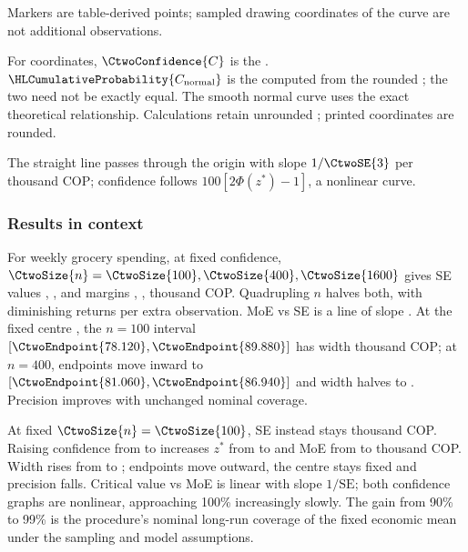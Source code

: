 \begin{landscape}
\begin{minipage}{\linewidth}
\begin{minipage}[t]{.43\linewidth}
Markers are table-derived points; sampled drawing coordinates of the curve are not additional observations.

For  coordinates, $\CtwoConfidence{C}$ is the . $\HLCumulativeProbability{C_{\rm normal}}$ is the  computed from the rounded ; the two need not be exactly equal. The smooth normal curve uses the exact theoretical relationship. Calculations retain unrounded ; printed coordinates are rounded.
\end{minipage}
\end{minipage}
\par\medskip

The straight line passes through the origin with slope $1/\CtwoSE{3}$ per thousand COP; confidence follows $100[2\Phi(z^*)-1]$, a nonlinear curve.

\clearpage
\CthreeNormalComparison

\end{landscape}
\clearpage
{}
\subsubsection*{Results in context}
For weekly grocery spending, at fixed  confidence, $\CtwoSize{n}=\CtwoSize{100},\CtwoSize{400},\CtwoSize{1600}$ gives SE values , ,  and margins , ,  thousand COP. Quadrupling $n$ halves both, with diminishing returns per extra observation. MoE vs SE is a line of slope . At the fixed centre , the $n=100$ interval $[\CtwoEndpoint{78.120},\CtwoEndpoint{89.880}]$ has width  thousand COP; at $n=400$, endpoints move inward to $[\CtwoEndpoint{81.060},\CtwoEndpoint{86.940}]$ and width halves to . Precision improves with unchanged nominal coverage.

At fixed $\CtwoSize{n}=\CtwoSize{100}$, SE instead stays  thousand COP. Raising confidence from  to  increases $z^*$ from  to  and MoE from  to  thousand COP. Width rises from  to ; endpoints move outward, the centre stays fixed and precision falls. Critical value vs MoE is linear with slope $1/\mathrm{SE}$; both confidence graphs are nonlinear, approaching 100\% increasingly slowly. The gain from 90\% to 99\% is the procedure's nominal long-run coverage of the fixed economic mean under the sampling and model assumptions.
\clearpage
